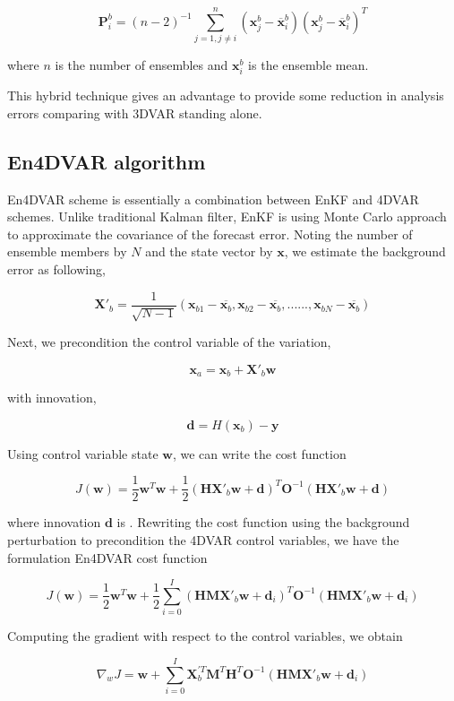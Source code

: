 \documentclass[a4,12pt]{article}
\numberwithin{equation}{section}
\begin{document}
$$\textbf{P}^{b}_{i} = (n-2)^{-1} \sum_{j=1, j \ne i}^{n}(\textbf{x}_{j}^{b} - \overline{\textbf{x}}_{i}^{b})(\textbf{x}_{j}^{b} - \overline{\textbf{x}}_{i}^{b})^{T}$$

where $n$ is the number of ensembles and  $\textbf{x}_{i}^{b}$ is the ensemble mean.

This hybrid technique gives an advantage to provide some reduction in analysis errors comparing with 3DVAR standing alone.

\subsection{En4DVAR algorithm}

En4DVAR scheme is essentially a combination between EnKF and 4DVAR schemes. Unlike traditional Kalman filter, EnKF is using Monte Carlo approach to approximate the covariance of the forecast error. Noting the number of ensemble members by $N$ and the state vector by $\textbf{x}$, we estimate the background error as following,

$$\textbf{X}'_{b}=\frac{1}{\sqrt{N-1}}(\textbf{x}_{b1}-\overline{\textbf{x}_{b}},\textbf{x}_{b2}-\overline{\textbf{x}_{b}},......,\textbf{x}_{bN}-\overline{\textbf{x}_{b}})$$

Next, we precondition the control variable of the variation,

$$\textbf{x}_{a} = \textbf{x}_{b} + \textbf{X}'_{b}\textbf{w}$$

with innovation,

$$\textbf{d} = H(\textbf{x}_{b})-\textbf{y}$$

Using control variable state $\textbf{w}$, we can write the cost function

$$J(\textbf{w}) = \frac{1}{2} \textbf{w}^{T}\textbf{w} + \frac{1}{2}(\textbf{H}\textbf{X}'_{b}\textbf{w}+\textbf{d})^{T}\textbf{O}^{-1}(\textbf{H}\textbf{X}'_{b}\textbf{w}+\textbf{d})$$

where innovation $\textbf{d}$ is . Rewriting the cost function using the background perturbation to precondition the 4DVAR control variables, we have the formulation En4DVAR cost function

$$J(\textbf{w}) = \frac{1}{2} \textbf{w}^{T}\textbf{w} + \frac{1}{2}\sum_{i=0}^{I}(\textbf{HM}\textbf{X}'_{b}\textbf{w} + \textbf{d}_{i})^{T}\textbf{O}^{-1}(\textbf{HMX}'_{b}\textbf{w}+\textbf{d}_{i})$$

Computing the gradient with respect to the control variables, we obtain

$$\nabla_{w}J = \textbf{w} + \sum_{i=0}^{I} \textbf{X}_{b}^{'T}\textbf{M}^{T}\textbf{H}^{T}\textbf{O}^{-1}(\textbf{HMX}'_{b}\textbf{w}+\textbf{d}_{i})$$
\end{document}
